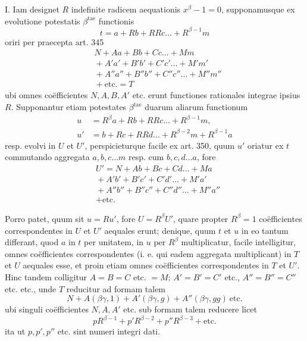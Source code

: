 I. Iam designet \(R\) indefinite radicem aequationis \(x^\beta-1=0\), supponamusque ex evolutione potestatis \(\beta^{\mathrm{tae}}\) functionis \[t=a+Rb+RRc\ldots+R^{\beta-1}m\] oriri per praecepta art. 345 \[\begin{aligned}&N+Aa+Bb+Cc\ldots+Mm\\&{}+A'a'+B'b'+C'c'\ldots+M'm'\\&{}+A''a''+B''b''+C''c''\ldots+M''m''\\&{}+\text{etc.}=T\end{aligned}\] ubi omnes coëfficientes \(N,\allowbreak A,\allowbreak B,\allowbreak A'\) etc. erunt functiones rationales integrae ipsius \(R\). Supponantur etiam potestates \(\beta^{\mathrm{tae}}\) duarum aliarum functionum \[\begin{aligned}u&=R^\beta a+Rb+RRc\ldots+R^{\beta-1}m,\\u'&=b+Rc+RRd\ldots+R^{\beta-2}m+R^{\beta-1}a\end{aligned}\] resp. evolvi in \(U\) et \(U'\), perspicieturque facile ex art. 350, quum \(u'\) oriatur ex \(t\) commutando aggregata \(a,\allowbreak b,\allowbreak c\ldots m\) resp. cum \(b,\allowbreak c,\allowbreak d\ldots a\), fore \[\begin{aligned}&U'=N+Ab+Bc+Cd\ldots+Ma\\&{}+A'b'+B'c'+C'd'\ldots+M'a'\\&{}+A''b''+B''c''+C''d''\ldots+M''a''\\&{}+\text{etc.}\end{aligned}\]

Porro patet, quum sit \(u=Ru'\), fore \(U=R^\beta U'\), quare propter \(R^\beta=1\) coëfficientes correspondentes in \(U\) et \(U'\) aequales erunt; denique, quum \(t\) et \(u\) in eo tantum differant, quod \(a\) in \(t\) per unitatem, in \(u\) per \(R^\beta\) multiplicatur, facile intelligitur, omnes coëfficientes correspondentes (i. e. qui eadem aggregata multiplicant) in \(T\) et \(U\) aequales esse, et proin etiam omnes coëfficientes correspondentes in \(T\) et \(U'\). Hinc tandem colligitur \(A=B=C\) etc. \(=M\);
\(A'=B'=C'\) etc., \(A''=B''=C''\) etc. etc., unde \(T\) reducitur ad formam talem \[N+A(\beta\gamma,1)+A'(\beta\gamma,g)+A''(\beta\gamma,gg)\ \text{etc.}\] ubi singuli coëfficientes \(N,\allowbreak A,\allowbreak A'\) etc. sub formam talem reducere licet \[pR^{\beta-1}+p'R^{\beta-2}+p''R^{\beta-3}+\text{etc.}\] ita ut \(p,\allowbreak p',\allowbreak p''\) etc. sint numeri integri dati.

